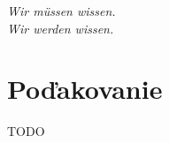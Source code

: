 \thispagestyle{empty}
\vspace*{\fill}

\begin{center}
\settowidth{}
\parbox{\longest}{
  \hrulefill\hspace{0.2cm} \decofourleft\decofourright \hspace{0.2cm} \hrulefill\par
  \raggedright{
  \itshape
  	Wir müssen wissen. \\ Wir werden wissen.\par
  }   
  \par
  \hrulefill\hspace{0.2cm} \decofourleft\decofourright\hspace{0.2cm} \hrulefill\par
}
\end{center}


\vspace*{\fill}
\section*{Poďakovanie}
{\small TODO }
%
%
%
%

\vspace{3cm}